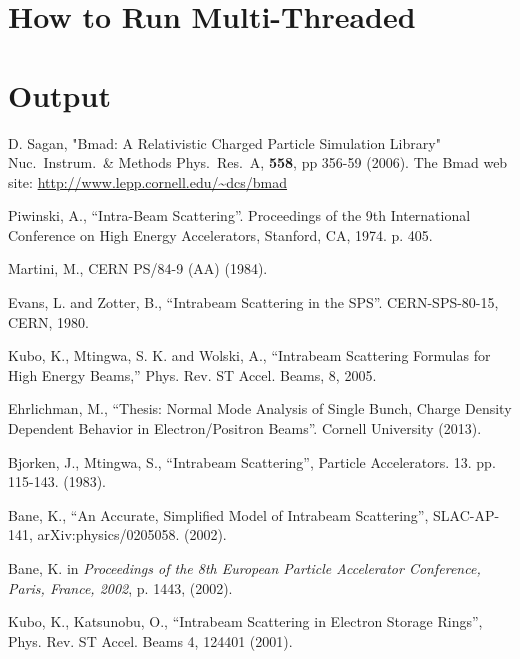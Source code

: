 \documentclass[11pt]{article}
\begin{document}
\section{How to Run Multi-Threaded} 
\label{s:multi}


\section{Output} 
\label{s:output}


\begin{thebibliography}{9}

D. Sagan,
"Bmad: A Relativistic Charged Particle Simulation Library"
Nuc.\ Instrum.\ \& Methods Phys.\ Res.\ A, {\bf 558}, pp 356-59 (2006).
The Bmad web site:
\hfill\break
\hspace*{0.3in} \url{http://www.lepp.cornell.edu/~dcs/bmad}

Piwinski, A., ``Intra-Beam Scattering''.
Proceedings of the 9th International Conference on High Energy Accelerators,
Stanford, CA, 1974. p. 405.

Martini, M., CERN PS/84-9 (AA) (1984).

Evans, L. and Zotter, B., ``Intrabeam Scattering in the SPS''.
CERN-SPS-80-15, CERN, 1980.

Kubo, K., Mtingwa, S. K. and Wolski, A., ``Intrabeam Scattering Formulas for 
High Energy Beams,'' Phys. Rev. ST Accel. Beams, 8, 2005.

Ehrlichman, M., ``Thesis: Normal Mode Analysis of Single Bunch, Charge Density
Dependent Behavior in Electron/Positron Beams''.  Cornell University (2013).

Bjorken, J., Mtingwa, S., ``Intrabeam Scattering'', Particle Accelerators. 13. 
pp. 115-143. (1983).

Bane, K., ``An Accurate, Simplified Model of Intrabeam Scattering'', SLAC-AP-141,
arXiv:physics/0205058. (2002).

Bane, K. in {\it Proceedings of the 8th European Particle Accelerator Conference, Paris,
France, 2002}, p. 1443, (2002).

Kubo, K., Katsunobu, O., ``Intrabeam Scattering in Electron Storage Rings'',
Phys. Rev. ST Accel. Beams 4, 124401 (2001).


\end{thebibliography}
\end{document}

